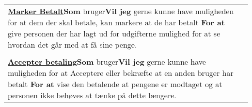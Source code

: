 \begin{tabular}{p{2.5in}p{2.5in}}
\textbf{\underline{Marker Betalt}}\newline \textbf{Som} bruger\newline \textbf{Vil jeg} gerne kunne have muligheden for at dem der skal betale, kan markere at de har betalt \newline \textbf{For at} give personen der har lagt ud for udgifterne mulighed for at se hvordan det går med at få sine penge.  \\\\
\textbf{\underline{Accepter betaling}}\newline \textbf{Som} bruger\newline \textbf{Vil jeg} gerne kunne have muligheden for at Acceptere eller bekræfte at en anden bruger har betalt \newline \textbf{For at} vise den betalende at pengene er modtaget og at personen ikke behøves at tænke på dette længere.  &  \\
\end{tabular}


